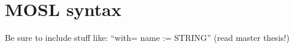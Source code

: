 \newpage
\section{MOSL syntax}
\genHeader

Be sure to include stuff like: ``with= name := STRING''  (read master thesis!)

